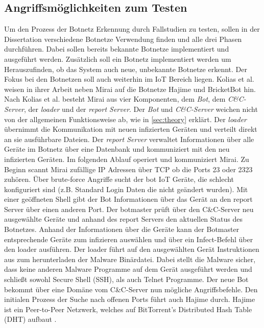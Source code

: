 \subsection*{Angriffsmöglichkeiten zum Testen}
Um den Prozess der Botnetz Erkennung durch Fallstudien zu testen, sollen in der Dissertation verschiedene Botnetze Verwendung finden und alle drei Phasen durchführen. Dabei sollen bereits bekannte
Botnetze implementiert und ausgeführt werden. Zusätzlich soll ein Botnetz implementiert werden um Herauszufinden, ob das System auch neue, unbekannte Botnetze erkennt. Der Fokus bei den Botnetzen 
soll auch weiterhin im IoT Bereich liegen. Kolias et al. \cite{DBLP:journals/computer/KoliasKSV17} weisen in ihrer Arbeit neben Mirai auf die Botnetze Hajime und BricketBot hin. 
Nach Kolias et al. besteht Mirai aus vier Komponenten, dem \textit{Bot}, dem \textit{C\&C-Server}, der \textit{loader} und der \textit{report Server}. Der \textit{Bot} und \textit{C\&C-Server} weichen
nicht von der allgemeinen Funktionsweise ab, wie in \ref{sec:theory} erklärt. Der \textit{loader} übernimmt die Kommunikation mit neuen infizierten Geräten und verteilt direkt an sie ausführbare Dateien.
Der \textit{report Server} verwaltet Informationen über alle Geräte im Botnetz über eine Datenbank und kommuniziert mit den neu infizierten Geräten. Im folgenden Ablauf operiert und kommuniziert Mirai. 
Zu Beginn scannt Mirai zufällige IP Adressen über TCP ob die Ports 23 oder 2323 zuhören. Über brute-force Angriffe sucht der bot IoT Geräte, die schlecht konfiguriert sind (z.B. Standard Login Daten die
nicht geändert wurden). Mit einer geöffneten Shell gibt der Bot Informationen über das Gerät an den report Server über einen anderen Port. Der botmaster prüft über den C\&C-Server neu ausgewählte Geräte 
und anhand des report Servers den aktuellen Status des Botnetzes. Anhand der Informationen über die Geräte kann der Botmaster entsprechende Geräte zum infizieren auswählen und über ein Infect-Befehl 
über den loader ausführen. Der loader führt auf den ausgewählten Gerät Instruktionen aus zum herunterladen der Malware Binärdatei. Dabei stellt die Malware sicher, dass keine anderen Malware Programme auf
dem Gerät ausgeführt werden und schließt sowohl Secure Shell (SSH), als auch Telnet Programme. Der neue Bot bekommt über eine Domäne vom C\&C-Server nun mögliche Angriffsbefehle. Den initialen Prozess 
der Suche nach offenen Ports führt auch Hajime durch. Hajime ist ein Peer-to-Peer Netzwerk, welches auf BitTorrent's Distributed Hash Table (DHT) aufbaut \cite{DBLP:conf/ndss/HerwigHHRL19,2017AnalyzingTP}. 

